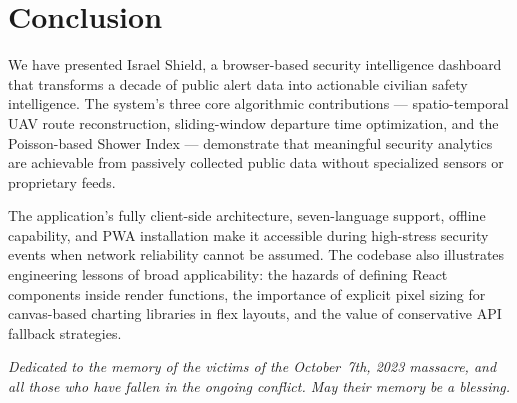 \documentclass[12pt,a4paper]{article}
\begin{document}
\section{Conclusion}
\label{sec:conclusion}

We have presented Israel Shield, a browser-based security intelligence dashboard
that transforms a decade of public alert data into actionable civilian safety
intelligence. The system's three core algorithmic contributions --- spatio-temporal
UAV route reconstruction, sliding-window departure time optimization, and the
Poisson-based Shower Index --- demonstrate that meaningful security analytics are
achievable from passively collected public data without specialized sensors or
proprietary feeds.

The application's fully client-side architecture, seven-language support, offline
capability, and PWA installation make it accessible during high-stress security
events when network reliability cannot be assumed. The codebase also illustrates
engineering lessons of broad applicability: the hazards of defining React
components inside render functions, the importance of explicit pixel sizing for
canvas-based charting libraries in flex layouts, and the value of conservative API
fallback strategies.

\vspace{0.8em}
\noindent\textit{Dedicated to the memory of the victims of the October~7th, 2023
massacre, and all those who have fallen in the ongoing conflict.
\emph{May their memory be a blessing.}}
\end{document}
